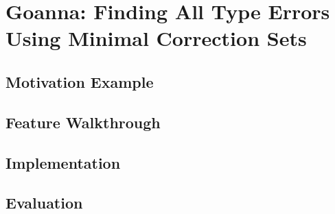 
\chapter{Goanna: Finding All Type Errors Using Minimal Correction Sets} \label{chapter4}



\section{Motivation Example}

\section{Feature Walkthrough}

\section{Implementation}

\section{Evaluation}
